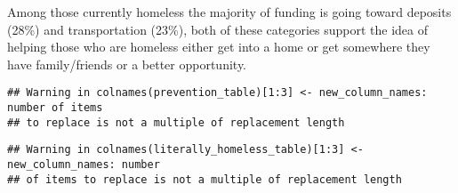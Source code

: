 \documentclass[
]{article}
\begin{document}
Among those currently homeless the majority of funding is going toward
deposits (28\%) and transportation (23\%), both of these categories
support the idea of helping those who are homeless either get into a
home or get somewhere they have family/friends or a better opportunity.

\begin{verbatim}
## Warning in colnames(prevention_table)[1:3] <- new_column_names: number of items
## to replace is not a multiple of replacement length
\end{verbatim}

\begin{verbatim}
## Warning in colnames(literally_homeless_table)[1:3] <- new_column_names: number
## of items to replace is not a multiple of replacement length
\end{verbatim}
\end{document}
